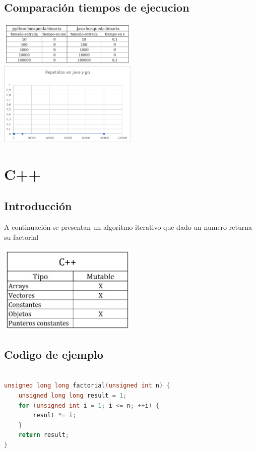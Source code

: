 \documentclass{article}
\begin{document}
\subsection{Comparación tiempos de ejecucion}
\includegraphics[width=0.5\textwidth]{pythonvsjavaTabla.png}
\includegraphics[width=0.5\textwidth]{golangvsjavaGrafica.png}

\section{C++}
\subsection{Introducción}
A continuación se presentan un algoritmo iterativo que dado un numero returna su factorial

\includegraphics[width=0.5\textwidth]{c++Tabla.jpg}

\subsection{Codigo de ejemplo}
\begin{lstlisting}[language=C++, caption=Ejemplo de código en C++]

unsigned long long factorial(unsigned int n) {
    unsigned long long result = 1;
    for (unsigned int i = 1; i <= n; ++i) {
        result *= i;
    }
    return result;
}

\end{lstlisting}
\end{document}
